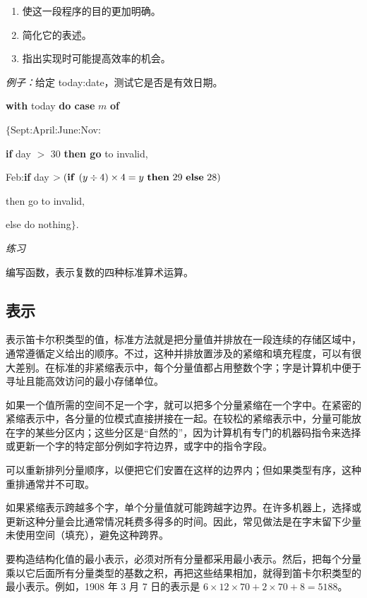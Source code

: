 \begin{enumerate}[wide, nosep, label=(\arabic*)]
	\item 使这一段程序的目的更加明确。
	\item 简化它的表述。
	\item 指出实现时可能提高效率的机会。
\end{enumerate}

\noindent
\textit{例子：}给定 today:date，测试它是否是有效日期。

\quad \textbf{with} today \textbf{do case} $m$ \textbf{of}

\quad \quad $\{$Sept:April:June:Nov:

\quad \quad \quad \textbf{if} day $>$ 30 \textbf{then go} to invalid,

\quad \quad \quad Feb:\textbf{if} day $> (\text{\textbf{if }} (y \div 4) \times 4 = y \text{ \textbf{then} } 29 \text{ \textbf{else} } 28)$

\quad \quad \quad \quad then go to invalid,

\quad \quad \quad else do nothing$\}$.

\noindent
\textit{练习}
\nopagebreak

\noindent
编写函数，表示复数的四种标准算术运算。

\subsection{表示}
\label{sec:representation-4-2}

表示笛卡尔积类型的值，标准方法就是把分量值并排放在一段连续的存储区域中，通常遵循定义给出的顺序。不过，这种并排放置涉及的紧缩和填充程度，可以有很大差别。在标准的非紧缩表示中，每个分量值都占用整数个字；字是计算机中便于寻址且能高效访问的最小存储单位。

如果一个值所需的空间不足一个字，就可以把多个分量紧缩在一个字中。在紧密的紧缩表示中，各分量的位模式直接拼接在一起。在较松的紧缩表示中，分量可能放在字的某些分区内；这些分区是“自然的”，因为计算机有专门的机器码指令来选择或更新一个字的特定部分\textemdash{}例如字符边界，或字中的指令字段。

可以重新排列分量顺序，以便把它们安置在这样的边界内；但如果类型有序，这种重排通常并不可取。

如果紧缩表示跨越多个字，单个分量值就可能跨越字边界。在许多机器上，选择或更新这种分量会比通常情况耗费多得多的时间。因此，常见做法是在字末留下少量未使用空间（填充），避免这种跨界。

要构造结构化值的最小表示，必须对所有分量都采用最小表示。然后，把每个分量乘以它后面所有分量类型的基数之积，再把这些结果相加，就得到笛卡尔积类型的最小表示。例如，1908 年 3 月 7 日的表示是 $6\times 12\times 70 + 2\times 70 + 8 = 5188$。

